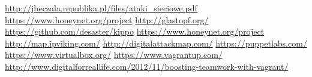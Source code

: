 \documentclass[runningheads,a4paper]{llncs}
\begin{document}
\begin{thebibliography}{1}


\bibitem{} \url{http://jbeczala.republika.pl/files/ataki_sieciowe.pdf}
 \url{https://www.honeynet.org/project}
\bibitem{} \url{http://glastopf.org/}
\bibitem{} \url{https://github.com/desaster/kippo}
\bibitem{} \url{https://www.honeynet.org/project}
\bibitem{} \url{http://map.ipviking.com/}
\bibitem{} \url{http://digitalattackmap.com/}
\bibitem{} \url{https://puppetlabs.com/}
\bibitem{} \url{https://www.virtualbox.org/}
\bibitem{} \url{https://www.vagrantup.com/}
\bibitem{} \url{http://www.digitalforreallife.com/2012/11/boosting-teamwork-with-vagrant/}


\end{thebibliography}
\end{document}
